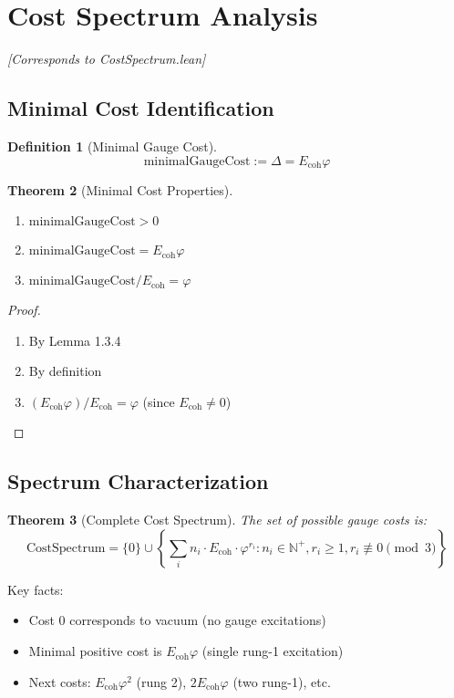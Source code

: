 \documentclass[11pt]{article}
\numberwithin{equation}{section}
\newtheorem{theorem}{Theorem}[section]
\newtheorem{definition}[theorem]{Definition}
\theoremstyle{remark}
\newcommand{\Ecoh}{E_{\text{coh}}}
\newcommand{\massGap}{\Delta}
\newcommand{\N}{\mathbb{N}}
\begin{document}
\section{Cost Spectrum Analysis}
\textit{[Corresponds to CostSpectrum.lean]}

\subsection{Minimal Cost Identification}

\begin{definition}[Minimal Gauge Cost]
\[\text{minimalGaugeCost} := \massGap = \Ecoh \varphi\]
\end{definition}

\begin{theorem}[Minimal Cost Properties]
\begin{enumerate}
\item $\text{minimalGaugeCost} > 0$
\item $\text{minimalGaugeCost} = \Ecoh \varphi$  
\item $\text{minimalGaugeCost} / \Ecoh = \varphi$
\end{enumerate}
\end{theorem}

\begin{proof}
\begin{enumerate}
\item By Lemma 1.3.4
\item By definition
\item $(\Ecoh \varphi) / \Ecoh = \varphi$ (since $\Ecoh \neq 0$)
\end{enumerate}
\end{proof}

\subsection{Spectrum Characterization}

\begin{theorem}[Complete Cost Spectrum]
The set of possible gauge costs is:
\[\text{CostSpectrum} = \{0\} \cup \left\{\sum_i n_i \cdot \Ecoh \cdot \varphi^{r_i} : n_i \in \N^+, r_i \geq 1, r_i \not\equiv 0 \pmod{3}\right\}\]
\end{theorem}

Key facts:
\begin{itemize}
\item Cost 0 corresponds to vacuum (no gauge excitations)
\item Minimal positive cost is $\Ecoh \varphi$ (single rung-1 excitation)
\item Next costs: $\Ecoh \varphi^2$ (rung 2), $2 \Ecoh \varphi$ (two rung-1), etc.
\end{itemize}
\end{document}
